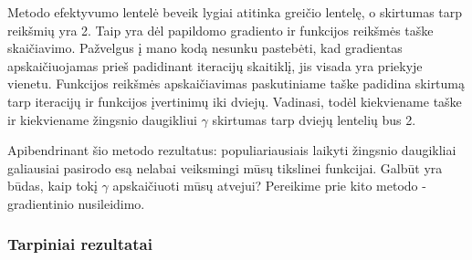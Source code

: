 \documentclass{article}
\begin{document}
Metodo efektyvumo lentelė beveik lygiai atitinka greičio lentelę, o skirtumas tarp reikšmių yra 2. Taip yra dėl papildomo gradiento ir funkcijos reikšmės taške skaičiavimo. Pažvelgus į mano kodą nesunku pastebėti, kad gradientas apskaičiuojamas prieš padidinant iteracijų skaitiklį, jis visada yra priekyje vienetu. Funkcijos reikšmės apskaičiavimas paskutiniame taške padidina skirtumą tarp iteracijų ir funkcijos įvertinimų iki dviejų. Vadinasi, todėl kiekviename taške ir kiekviename žingsnio daugikliui $\gamma$ skirtumas tarp dviejų lentelių bus 2.

Apibendrinant šio metodo rezultatus: populiariausiais laikyti žingsnio daugikliai galiausiai pasirodo esą nelabai veiksmingi mūsų tikslinei funkcijai. Galbūt yra būdas, kaip tokį $\gamma$ apskaičiuoti mūsų atvejui? Pereikime prie kito metodo - gradientinio nusileidimo.
\subsubsection{Tarpiniai rezultatai}
\end{document}
